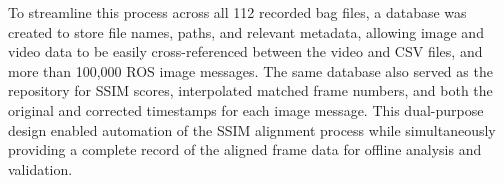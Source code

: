 \documentclass[../main.tex]{subfiles}
\begin{document}
To streamline this process across all 112 recorded bag files, a database was created to store file names, paths, and relevant metadata, allowing image and video data to be easily cross-referenced between the video and CSV files, and more than 100,000 ROS image messages. 
The same database also served as the repository for SSIM scores, interpolated matched frame numbers, and both the original and corrected timestamps for each image message. 
This dual-purpose design enabled automation of the SSIM alignment process while simultaneously providing a complete record of the aligned frame data for offline analysis and validation.
\end{document}

